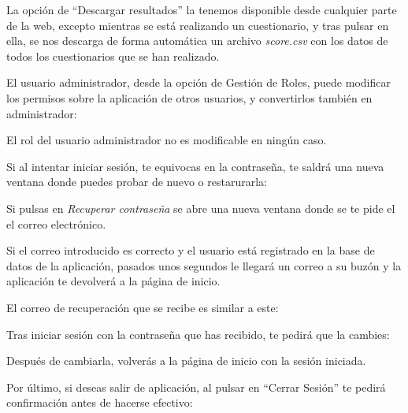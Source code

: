 La opción de ``Descargar resultados'' la tenemos disponible desde cualquier parte de la web, excepto mientras se está realizando un cuestionario, y tras pulsar en ella, se nos descarga de forma automática un archivo \textit{score.csv} con los datos de todos los cuestionarios que se han realizado.


El usuario administrador, desde la opción de Gestión de Roles, puede modificar los permisos sobre la aplicación de otros usuarios, y convertirlos también en administrador:


El rol del usuario administrador no es modificable en ningún caso.

Si al intentar iniciar sesión, te equivocas en la contraseña, te saldrá una nueva ventana donde puedes probar de nuevo o restarurarla:


Si pulsas en \textit{Recuperar contraseña} se abre una nueva ventana donde se te pide el el correo electrónico.

Si el correo introducido es correcto y el usuario está registrado en la base de datos de la aplicación, pasados unos segundos le llegará un correo a su buzón y la aplicación te devolverá a la página de inicio.

El correo de recuperación que se recibe es similar a este:

Tras iniciar sesión con la contraseña que has recibido, te pedirá que la cambies:

Después de cambiarla, volverás a la página de inicio con la sesión iniciada.

\clearpage
Por último, si deseas salir de aplicación, al pulsar en ``Cerrar Sesión'' te pedirá confirmación antes de hacerse efectivo:






